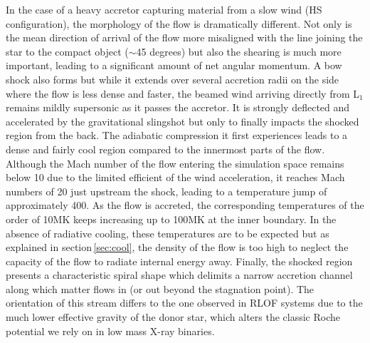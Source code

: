 \documentclass{aa}
\makeatletter
\newcommand*{\rlof}{RLOF\@\xspace}
\makeatother
\begin{document}
In the case of a heavy accretor capturing material from a slow wind (HS configuration), the morphology of the flow is dramatically different. Not only is the mean direction of arrival of the flow more misaligned with the line joining the star to the compact object ($\sim$45 degrees) but also the shearing is much more important, leading to a significant amount of net angular momentum. A bow shock also forms but while it extends over several accretion radii on the side where the flow is less dense and faster, the beamed wind arriving directly from L$_1$ remains mildly supersonic as it passes the accretor. It is strongly deflected and accelerated by the gravitational slingshot but only to finally impacts the shocked region from the back. The adiabatic compression it first experiences leads to a dense and fairly cool region compared to the innermost parts of the flow. Although the Mach number of the flow entering the simulation space remains below 10 due to the limited efficient of the wind acceleration, it reaches Mach numbers of 20 just upstream the shock, leading to a temperature jump of approximately 400. As the flow is accreted, the corresponding temperatures of the order of 10MK keeps increasing up to 100MK at the inner boundary. In the absence of radiative cooling, these temperatures are to be expected but as explained in section\,\ref{sec:cool}, the density of the flow is too high to neglect the capacity of the flow to radiate internal energy away. Finally, the shocked region presents a characteristic spiral shape which delimits a narrow accretion channel along which matter flows in (or out beyond the stagnation point). The orientation of this stream differs to the one observed in \rlof systems due to the much lower effective gravity of the donor star, which alters the classic Roche potential we rely on in low mass X-ray binaries.
\end{document}
